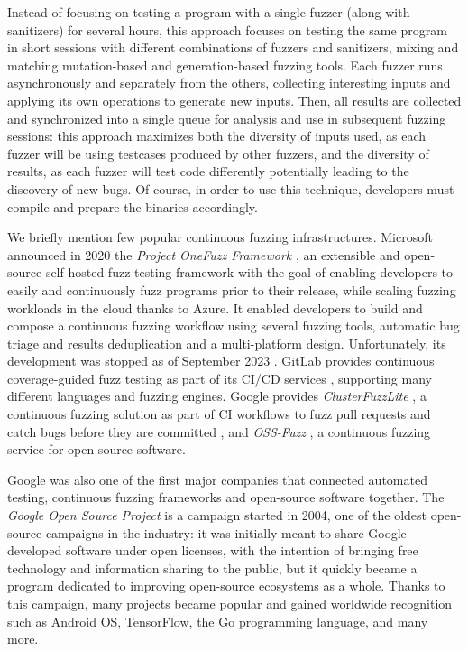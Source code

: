 Instead of focusing on testing a program with a single fuzzer (along with sanitizers) for several hours, this approach focuses on testing the same program in short sessions with different combinations of fuzzers and sanitizers, mixing and matching mutation-based and generation-based fuzzing tools. Each fuzzer runs asynchronously and separately from the others, collecting interesting inputs and applying its own operations to generate new inputs. Then, all results are collected and synchronized into a single queue for analysis and use in subsequent fuzzing sessions: this approach maximizes both the diversity of inputs used, as each fuzzer will be using testcases produced by other fuzzers, and the diversity of results, as each fuzzer will test code differently potentially leading to the discovery of new bugs. Of course, in order to use this technique, developers must compile and prepare the binaries accordingly.

\newpage
We briefly mention few popular continuous fuzzing infrastructures. Microsoft announced in 2020 the \textit{Project OneFuzz Framework} \cite{onefuzz}, an extensible and open-source self-hosted fuzz testing framework with the goal of enabling developers to easily and continuously fuzz programs prior to their release, while scaling fuzzing workloads in the cloud thanks to Azure. It enabled developers to build and compose a continuous fuzzing workflow using several fuzzing tools, automatic bug triage and results deduplication and a multi-platform design. Unfortunately, its development was stopped as of September 2023 \cite{onefuzz_repo}. GitLab provides continuous coverage-guided fuzz testing as part of its CI/CD services \cite{gitlab_fuzz}, supporting many different languages and fuzzing engines. Google provides \textit{ClusterFuzzLite} \cite{google_lite_repo}, a continuous fuzzing solution as part of CI workflows to fuzz pull requests and catch bugs before they are committed \cite{google_lite}, and \textit{OSS-Fuzz} \cite{ossfuzz_paper}, a continuous fuzzing service for open-source software.

Google was also one of the first major companies that connected automated testing, continuous fuzzing frameworks and open-source software together. The \textit{Google Open Source Project} \cite{google_oss} is a campaign started in 2004, one of the oldest open-source campaigns in the industry: it was initially meant to share Google-developed software under open licenses, with the intention of bringing free technology and information sharing to the public, but it quickly became a program dedicated to improving open-source ecosystems as a whole. Thanks to this campaign, many projects became popular and gained worldwide recognition such as Android OS, TensorFlow, the Go programming language, and many more.

